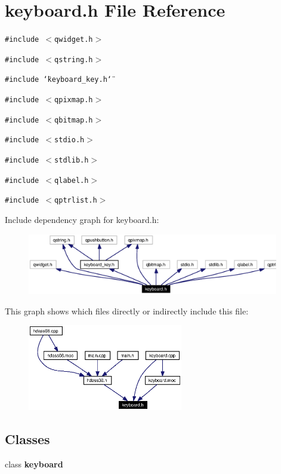 \section{keyboard.h File Reference}
\label{keyboard_8h}


{\tt \#include $<$qwidget.h$>$}\par
{\tt \#include $<$qstring.h$>$}\par
{\tt \#include \char`\"{}keyboard\_\-key.h\char`\"{}}\par
{\tt \#include $<$qpixmap.h$>$}\par
{\tt \#include $<$qbitmap.h$>$}\par
{\tt \#include $<$stdio.h$>$}\par
{\tt \#include $<$stdlib.h$>$}\par
{\tt \#include $<$qlabel.h$>$}\par
{\tt \#include $<$qptrlist.h$>$}\par


Include dependency graph for keyboard.h:\begin{figure}[H]
\begin{center}
\leavevmode
\includegraphics[width=311pt]{keyboard_8h__incl}
\end{center}
\end{figure}


This graph shows which files directly or indirectly include this file:\begin{figure}[H]
\begin{center}
\leavevmode
\includegraphics[width=192pt]{keyboard_8h__dep__incl}
\end{center}
\end{figure}
\subsection*{Classes}
\begin{CompactItemize}
\item 
class {\bf keyboard}
\end{CompactItemize}

